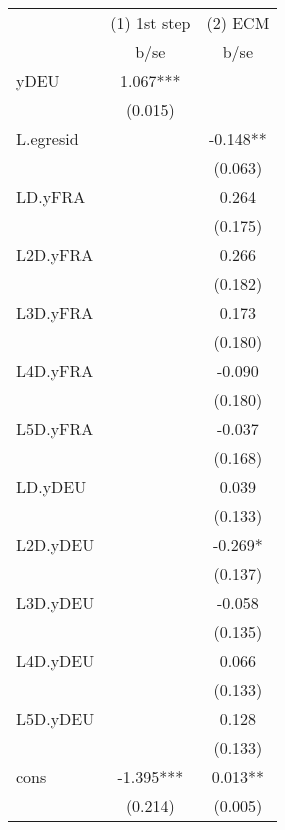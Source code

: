 \begin{tabular}{lcc}\toprule
            &(1) 1st step   &     (2) ECM   \\
            &        b/se   &        b/se   \\
\midrule
yDEU        &       1.067***&               \\
            &     (0.015)   &               \\
L.egresid  &               &      -0.148** \\
            &               &     (0.063)   \\
LD.yFRA     &               &       0.264   \\
            &               &     (0.175)   \\
L2D.yFRA    &               &       0.266   \\
            &               &     (0.182)   \\
L3D.yFRA    &               &       0.173   \\
            &               &     (0.180)   \\
L4D.yFRA    &               &      -0.090   \\
            &               &     (0.180)   \\
L5D.yFRA    &               &      -0.037   \\
            &               &     (0.168)   \\
LD.yDEU     &               &       0.039   \\
            &               &     (0.133)   \\
L2D.yDEU    &               &      -0.269*  \\
            &               &     (0.137)   \\
L3D.yDEU    &               &      -0.058   \\
            &               &     (0.135)   \\
L4D.yDEU    &               &       0.066   \\
            &               &     (0.133)   \\
L5D.yDEU    &               &       0.128   \\
            &               &     (0.133)   \\
cons       &      -1.395***&       0.013** \\
            &     (0.214)   &     (0.005)   \\
\bottomrule \end{tabular} \\ 
